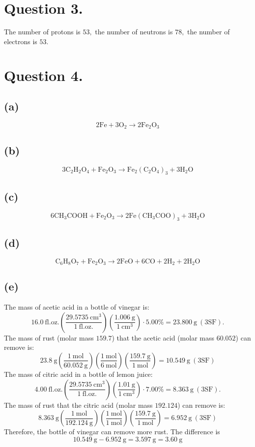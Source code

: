 \documentclass{article}
\newcommand{\unit}[1]{\mathrm{~#1}}
\begin{document}
\section*{Question 3.}
The number of protons is $53,$ the number of neutrons is $78,$ the number of electrons is $53.$
\newpage

\section*{Question 4.}
\subsection*{(a)}
$$
\mathrm{
2Fe + 3O_2 \rightarrow 2Fe_2O_3
}
$$
\subsection*{(b)}
$$
\mathrm{
3C_2H_2O_4 + Fe_2O_3 \rightarrow Fe_2(C_2O_4)_3 + 3H_2O
}
$$
\subsection*{(c)}
$$
\mathrm{
6CH_3COOH + Fe_2O_3 \rightarrow 2Fe(CH_3COO)_3 + 3H_2O
}
$$
\subsection*{(d)}
$$
\mathrm{
C_6H_8O_7 + Fe_2O_3 \rightarrow 2FeO + 6CO + 2H_2 + 2H_2O
}
$$
\subsection*{(e)}
The mass of acetic acid in a bottle of vinegar is:
$$
16.0\unit{fl.oz.} (\frac{29.5735\unit{cm^3}}{1 \unit{fl.oz.}}) (\frac{1.006\unit{g}}{1\unit{cm^3}}) \cdot 5.00\% = 23.800\unit{g~(3SF)}.
$$
The mass of rust (molar mass $159.7$) that the acetic acid (molar mass $60.052$) can remove is:
$$
23.8\unit{g} (\frac{1\unit{mol}}{60.052\unit{g}}) (\frac{1\unit{mol}}{6\unit{mol}}) (\frac{159.7\unit{g}}{1\unit{mol}}) = 10.549\unit{g~(3SF)}
$$
The mass of citric acid in a bottle of lemon juice:
$$
4.00\unit{fl.oz.} (\frac{29.5735\unit{cm^3}}{1 \unit{fl.oz.}}) (\frac{1.01\unit{g}}{1\unit{cm^3}}) \cdot 7.00\% = 8.363\unit{g~(3SF)}.
$$
The mass of rust that the citric acid (molar mass $192.124$) can remove is:
$$
8.363\unit{g} (\frac{1\unit{mol}}{192.124\unit{g}}) (\frac{1\unit{mol}}{1\unit{mol}}) (\frac{159.7\unit{g}}{1\unit{mol}}) = 6.952\unit{g~(3SF)}
$$
Therefore, the bottle of vinegar can remove more rust. The difference is 
$$
10.549\unit{g} - 6.952\unit{g} = 3.597\unit{g} = 3.60\unit{g}
$$
\newpage
\end{document}
